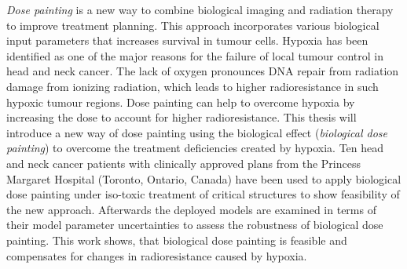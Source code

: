 
\textit{Dose painting} is a new way to combine biological imaging and radiation therapy to improve treatment planning. This approach incorporates various biological input parameters that increases survival in tumour cells.  Hypoxia has been identified as one of the major reasons for the failure of local tumour control in head and neck cancer. The lack of oxygen pronounces DNA repair from radiation damage from ionizing radiation, which leads to higher radioresistance in such hypoxic tumour regions. Dose painting can help to overcome hypoxia by increasing the dose to account for higher radioresistance. This thesis will introduce a new way of dose painting using the biological effect (\textit{biological dose painting}) to overcome the treatment deficiencies created by hypoxia. Ten head and neck cancer patients with clinically approved plans from the Princess Margaret Hospital (Toronto, Ontario, Canada) have been used to apply biological dose painting under iso-toxic treatment of critical structures to show feasibility of the new approach. Afterwards the deployed models are examined in terms of their model parameter uncertainties to assess the robustness of biological dose painting. This work shows, that biological dose painting is feasible and compensates for changes in radioresistance caused by hypoxia. 